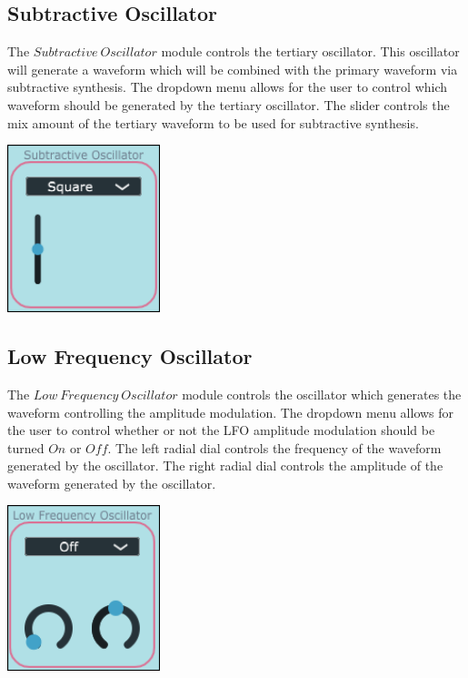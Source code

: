 \documentclass[a4paper,12pt]{report}
\begin{document}
\subsection{Subtractive Oscillator}
\label{subsec:subosc}
The $Subtractive\ Oscillator$ module controls the tertiary oscillator. This oscillator will generate a waveform which will be combined with the primary waveform via subtractive synthesis. The dropdown menu allows for the user to control which waveform should be generated by the tertiary oscillator. The slider controls the mix amount of the tertiary waveform to be used for subtractive synthesis.

\begin{center}
\includegraphics[width=12em]{SubOscScreenshot.png}
\end{center}

\subsection{Low Frequency Oscillator}
\label{subsec:lfo}
The $Low\ Frequency\ Oscillator$ module controls the oscillator which generates the waveform controlling the amplitude modulation. The dropdown menu allows for the user to control whether or not the LFO amplitude modulation should be turned $On$ or $Off$. The left radial dial controls the frequency of the waveform generated by the oscillator. The right radial dial controls the amplitude of the waveform generated by the oscillator.

\begin{center}
\includegraphics[width=12em]{LFOScreenshot.png}
\end{center}
\end{document}
